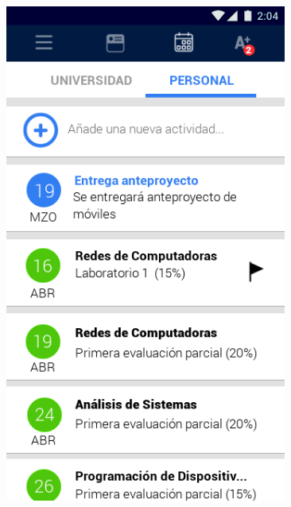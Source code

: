 \documentclass[12pt]{article}
\begin{document}
\begin{figure}[t]
\begin{minipage}[t]{0.45\textwidth}
		\includegraphics[width=0.825\textwidth]{img/4.png}
	\end{minipage}
\end{figure}
\end{document}

